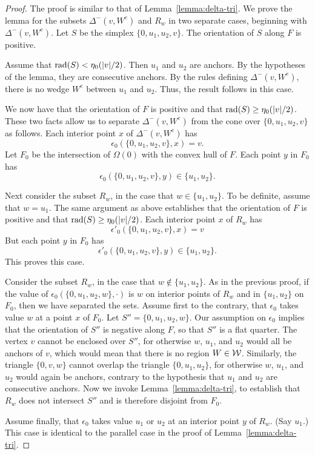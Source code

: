 \begin{proof} The proof is similar to that of
Lemma~\ref{lemma:delta-tri}.  We prove the lemma for the subsets
$\Delta^-(v,W^e)$ and $R_w$ in two separate cases, beginning with
$\Delta^-(v,W^e)$.  Let $S$ be the simplex $\{0,u_1,u_2,v\}$. The
orientation of $S$ along $F$ is positive.

Assume that $\operatorname{rad}(S)< \eta_0(|v|/2)$.  Then $u_1$ and $u_2$ are
anchors.  By the hypotheses of the lemma, they are consecutive
anchors.  By the rules defining $\Delta^-(v,W^e)$, there is no
wedge $W^e$ between $u_1$ and $u_2$.  Thus, the result follows in
this case.


We now have that the orientation of $F$ is positive and that
$\operatorname{rad}(S) \ge \eta_0(|v|/2)$. These two facts allow us to separate
$\Delta^-(v,W^e)$ from the cone over $\{0,u_1,u_2,v\}$ as follows.
Each interior point $x$ of $\Delta^-(v,W^e)$ has
$$\epsilon_0( \{ 0,u_1,u_2,v \} ,x) = v.$$
Let $F_0$ be the intersection of $\Omega(0)$ with the convex hull
of $F$.  Each point $y$ in $F_0$  has
$$\epsilon_0( \{ 0,u_1,u_2,v \} ,y) \in \{u_1,u_2\}.$$

Next consider the subset $R_w$, in the case that
$w\in\{u_1,u_2\}$.  To be definite, assume that $w=u_1$.  The same
argument as above establishes that the orientation of $F$ is
positive and that $\operatorname{rad}(S) \ge \eta_0(|v|/2)$. Each interior point
$x$ of $R_w$ has
$$\epsilon'_0( \{ 0,u_1,u_2,v \} ,x) = v$$
But each point $y$ in $F_0$ has
$$\epsilon'_0( \{ 0,u_1,u_2,v \} ,y) \in \{u_1,u_2\}.$$
This proves this case.

Consider the subset $R_w$, in the case that $w\not\in\{u_1,u_2\}$.
As in the previous proof, if the value of
$\epsilon_0(\{0,u_1,u_2,w\},\cdot)$ is $w$ on interior points of
$R_w$ and in $\{u_1,u_2\}$ on $F_0$, then we have separated the
sets.  Assume first to the contrary, that $\epsilon_0$ takes value
$w$ at a point $x$ of $F_0$.  Let $S''=\{0,u_1,u_2,w\}$.  Our
assumption on $\epsilon_0$ implies that the orientation of $S''$
is negative along $F$, so that $S''$ is a flat quarter.  The
vertex $v$ cannot be enclosed over $S''$, for otherwise $w$,
$u_1$, and $u_2$ would all be anchors of $v$, which would mean
that there is no region $W\in{\mathcal W}$.  Similarly, the triangle
$\{0,v,w\}$ cannot overlap the triangle $\{0,u_1,u_2\}$, for
otherwise $w$, $u_1$, and $u_2$ would again be anchors, contrary
to the hypothesis that $u_1$ and $u_2$ are consecutive anchors.
Now we invoke Lemma~\ref{lemma:delta-tri}, to establish that $R_w$
does not intersect $S''$ and is therefore disjoint from $F_0$.

Assume finally, that $\epsilon_0$ takes value $u_1$ or $u_2$ at an
interior point $y$ of  $R_w$. (Say $u_1$.)   This case is
identical to the parallel case in the proof of
Lemma~\ref{lemma:delta-tri}.
\end{proof}

